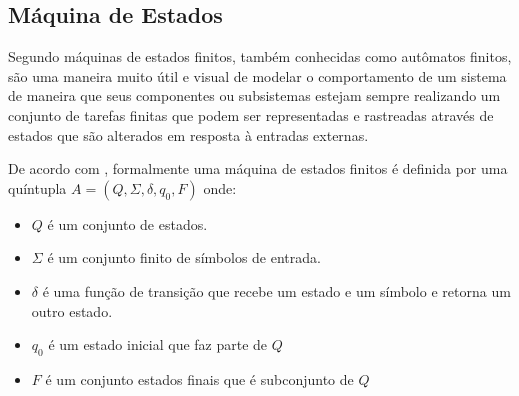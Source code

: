 \subsection{Máquina de Estados}

Segundo  máquinas de estados finitos, também conhecidas como autômatos finitos, são uma maneira muito útil e visual de modelar o comportamento de um sistema de maneira que seus componentes ou subsistemas estejam sempre realizando um conjunto de tarefas finitas que podem ser representadas e rastreadas através de estados que são alterados em resposta à entradas externas. 

De acordo com , formalmente uma máquina de estados finitos é definida por uma quíntupla $A = (Q, \Sigma, \delta, q_0, F)$ onde:

\begin{itemize}
    \item $Q$ é um conjunto de estados.
    \item $\Sigma$ é um conjunto finito de símbolos de entrada.
    \item $\delta$ é uma função de transição que recebe um estado e um símbolo e retorna um outro estado.
    \item $q_0$ é um estado inicial que faz parte de $Q$
    \item $F$ é um conjunto estados finais que é subconjunto de $Q$ 
\end{itemize}

